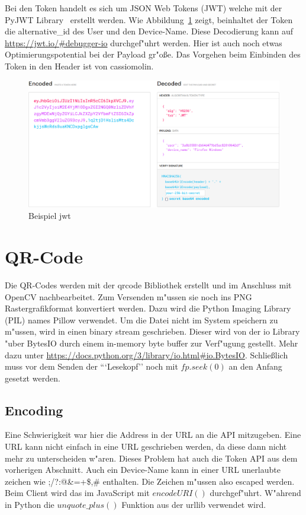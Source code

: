Bei den Token handelt es sich um JSON Web Tokens (JWT) welche mit der PyJWT Library~\cite{jwt} erstellt werden.
Wie Abbildung~\ref{fig: jwt} zeigt, beinhaltet der Token die alternative\_id des User und den Device-Name.
Diese Decodierung kann auf \url{https://jwt.io/#debugger-io} durchgef{"u}hrt werden.
Hier ist auch noch etwas Optimierungspotential bei der Payload gr{"o}\ss e.
Das Vorgehen beim Einbinden des Token in den Header ist von cassiomolin\cite{cassiomolin}.

\begin{figure}[h]
    \centering
    \includegraphics[width=\textwidth]{jwt}
    \caption{Beispiel jwt}
    \label{fig: jwt}
\end{figure}

\section{QR-Code}\label{sec:qr}
Die QR-Codes werden mit der qrcode Bibliothek erstellt und im Anschluss mit OpenCV nachbearbeitet.
Zum Versenden m{"u}ssen sie noch ins PNG Rastergrafikformat konvertiert werden.
Dazu wird die Python Imaging Library (PIL) names Pillow verwendet.
Um die Datei nicht im System speichern zu m{"u}ssen, wird in einen binary stream geschrieben.
Dieser wird von der io Library {"u}ber BytesIO durch einem in-memory byte buffer zur Verf{"u}gung gestellt.
Mehr dazu unter \url{https://docs.python.org/3/library/io.html#io.BytesIO}.
Schlie\ss lich muss vor dem Senden der ```Lesekopf'' noch mit $fp.seek(0)$ an den Anfang gesetzt werden.

\subsection{Encoding}\label{subsec:encode}
Eine Schwierigkeit war hier die Address in der URL an die API mitzugeben.
Eine URL kann nicht einfach in eine URL geschrieben werden, da diese dann nicht mehr zu unterscheiden w{"a}ren.
Dieses Problem hat auch die Token API aus dem vorherigen Abschnitt.
Auch ein Device-Name kann in einer URL unerlaubte zeichen wie ;/?:@\&=+\$,\# enthalten.
Die Zeichen m{"u}ssen also escaped werden.
Beim Client wird das im JavaScript mit $encodeURI()$\cite{encodeURI} durchgef{"u}hrt.
W{"a}hrend in Python die $unquote\_plus()$\cite{unquoteplus} Funktion aus der urllib verwendet wird.


